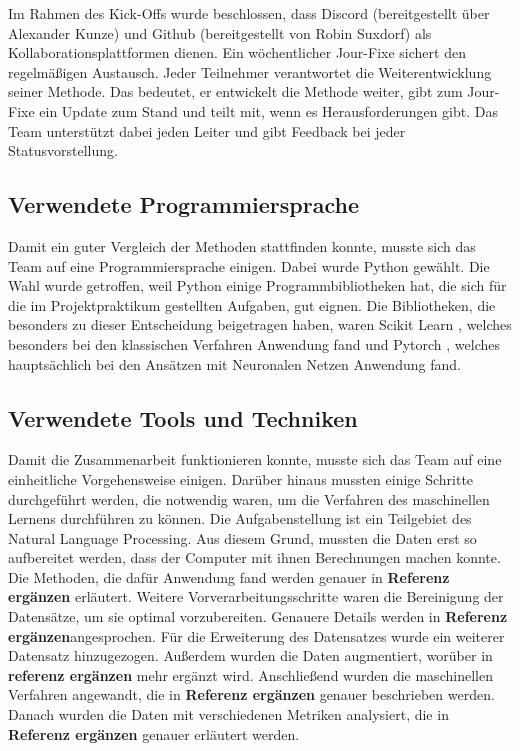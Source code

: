 Im Rahmen des Kick-Offs wurde beschlossen, dass Discord (bereitgestellt über Alexander Kunze) und Github (bereitgestellt von Robin Suxdorf) als Kollaborationsplattformen dienen. Ein wöchentlicher Jour-Fixe sichert den regelmäßigen Austausch. Jeder Teilnehmer verantwortet die Weiterentwicklung seiner Methode. Das bedeutet, er entwickelt die Methode weiter, gibt zum Jour-Fixe ein Update zum Stand und teilt mit, wenn es Herausforderungen gibt. Das Team unterstützt dabei jeden Leiter und gibt Feedback bei jeder Statusvorstellung.


\subsection{Verwendete Programmiersprache}
Damit ein guter Vergleich der Methoden stattfinden konnte, musste sich das Team auf eine Programmiersprache einigen. Dabei wurde Python gewählt. Die Wahl wurde getroffen, weil Python einige Programmbibliotheken hat, die sich für die im Projektpraktikum gestellten Aufgaben, gut eignen. Die Bibliotheken, die besonders zu dieser Entscheidung beigetragen haben, waren Scikit Learn \cite{skicitLearnRef}, welches besonders bei den klassischen Verfahren Anwendung fand und Pytorch \cite{pytorchRef}, welches hauptsächlich bei den Ansätzen mit Neuronalen Netzen Anwendung fand.

\subsection{Verwendete Tools und Techniken}
Damit die Zusammenarbeit funktionieren konnte, musste sich das Team auf eine einheitliche Vorgehensweise einigen. Darüber hinaus mussten einige Schritte durchgeführt werden, die notwendig waren, um die Verfahren des maschinellen Lernens durchführen zu können. Die Aufgabenstellung ist ein Teilgebiet des Natural Language Processing. Aus diesem Grund, mussten die Daten erst so aufbereitet werden, dass der Computer mit ihnen Berechnungen machen konnte. Die Methoden, die dafür Anwendung fand werden genauer in \textbf{Referenz ergänzen} erläutert. Weitere Vorverarbeitungsschritte waren die Bereinigung der Datensätze, um sie optimal vorzubereiten. Genauere Details werden in \textbf{Referenz ergänzen}angesprochen. Für die Erweiterung des Datensatzes wurde ein weiterer Datensatz hinzugezogen. Außerdem wurden die Daten augmentiert, worüber in \textbf{referenz ergänzen} mehr ergänzt wird. Anschließend wurden die maschinellen Verfahren angewandt, die in \textbf{Referenz ergänzen} genauer beschrieben werden. Danach wurden die Daten mit verschiedenen Metriken analysiert, die in \textbf{Referenz ergänzen} genauer erläutert werden.